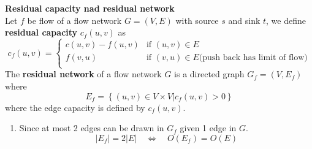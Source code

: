\documentclass[11pt]{article}
\begin{document}
\begin{defn*}
  \textbf{Residual capacity nad residual network}\\
  Let $f$ be flow of a flow network $G = (V,E)$ with source $s$ and sink $t$, we define \textbf{residual capacity} $c_f(u,v)$ as
  \[
    c_f(u,v) =
    \begin{cases}
      c(u,v) - f(u,v) & \text{if } (u, v)\in E\\
      f(v, u) & \text{if } (v, u) \in E \text{(push back has limit of flow)}\\
    \end{cases}
  \]
  The \textbf{residual network} of a flow network $G$ is a directed graph $G_f = (V, E_f)$ where
  \[
    E_f =\left\{ (u,v)\in V\times V | c_f(u,v) >0 \right\}
  \]
  where the edge capacity is defined by $c_f(u,v)$.
  \begin{enumerate}
    \item Since at most 2 edges can be drawn in $G_f$ given 1 edge in $G$.
    \[
      |E_f| = 2|E|  \quad \iff \quad O(E_f) = O(E)
    \]
  \end{enumerate}
\end{defn*}
\end{document}
